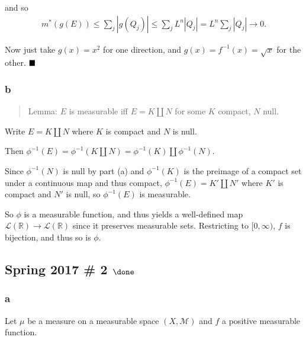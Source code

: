 \begin{solution}
and so
\begin{align*}
m^*(g(E)) \leq \sum_j {\left\lvert {g(Q_j)} \right\rvert} \leq \sum_j L^n {\left\lvert {Q_j} \right\rvert} = L^n \sum_j {\left\lvert {Q_j} \right\rvert} \to 0 
.\end{align*}

Now just take \(g(x) = x^2\) for one direction, and
\(g(x) = f^{-1}(x) = \sqrt{x}\) for the other. \(\hfill\blacksquare\)

\hypertarget{b-4}{%
\subsubsection{b}\label{b-4}}

\begin{quote}
Lemma: \(E\) is measurable iff \(E = K {\coprod}N\) for some \(K\)
compact, \(N\) null.
\end{quote}

Write \(E = K {\coprod}N\) where \(K\) is compact and \(N\) is null.

Then
\(\phi^{-1}(E) = \phi^{-1}(K {\coprod}N) = \phi^{-1}(K) {\coprod}\phi^{-1}(N)\).

Since \(\phi^{-1}(N)\) is null by part (a) and \(\phi^{-1}(K)\) is the
preimage of a compact set under a continuous map and thus compact,
\(\phi^{-1}(E) = K' {\coprod}N'\) where \(K'\) is compact and \(N'\) is
null, so \(\phi^{-1}(E)\) is measurable.

So \(\phi\) is a measurable function, and thus yields a well-defined map
\(\mathcal L({\mathbb{R}}) \to \mathcal L({\mathbb{R}})\) since it
preserves measurable sets. Restricting to \([0, \infty)\), \(f\) is
bijection, and thus so is \(\phi\).

\end{solution}

\hypertarget{spring-2017-2-done}{%
\subsection{\texorpdfstring{Spring 2017 \# 2
\(\done\)}{Spring 2017 \# 2 \textbackslash done}}\label{spring-2017-2-done}}

\hypertarget{a-5}{%
\subsubsection{a}\label{a-5}}

Let \(\mu\) be a measure on a measurable space \((X, \mathcal M)\) and
\(f\) a positive measurable function.

